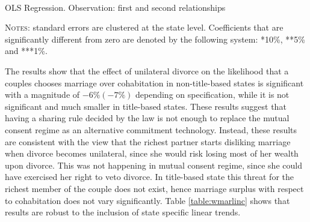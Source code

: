 \documentclass[12pt]{article}
\numberwithin{table}{section}
\begin{document}
	\begin{table}[H]\centering
		\caption{\\OLS Regression. Observation: first and second relationships}
		\label{table:wmarc}
		\begin{threeparttable}[t]\centering
			
			\begin{tablenotes}[flushleft]
				\footnotesize{\item \textsc{Notes}: standard errors are clustered at the state level.
					Coefficients that are significantly different from zero are denoted by the following system: *10\%, **5\%  and ***1\%.}
			\end{tablenotes}
		\end{threeparttable}
	\end{table}
\FloatBarrier
The results show that the effect of unilateral divorce on the likelihood that a couples chooses marriage over cohabitation in non-title-based states is significant with a magnitude of $-6\%(-7\%)$ depending on specification, while it is not significant and much smaller in title-based states. These results suggest that having a sharing rule decided by the law is not enough to replace the mutual consent regime as an alternative commitment technology. Instead, these results are consistent with the view that the richest partner starts disliking marriage when divorce becomes unilateral, since she would risk losing most of her wealth upon divorce. This was not happening in mutual consent regime, since she could have exercised her right to veto divorce. In title-based state this threat for the richest member of the couple does not exist, hence marriage surplus with respect to cohabitation does not vary significantly. Table \ref{table:wmarlinc} shows that results are robust to the inclusion of state specific linear trends.
\end{document}
